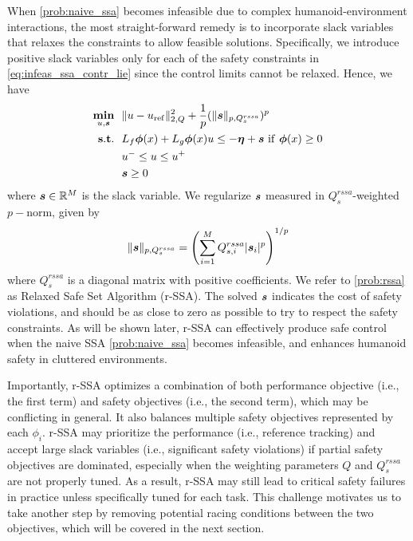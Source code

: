 When \eqref{prob:naive_ssa} becomes infeasible due to complex humanoid-environment interactions, the most straight-forward remedy is to incorporate slack variables that relaxes the constraints to allow feasible solutions.
Specifically, we introduce positive slack variables only for each of the safety constraints in \eqref{eq:infeas_ssa_contr_lie} since the control limits cannot be relaxed.
Hence, we have
\begin{subequations}\label{prob:rssa}
\begin{align}
\mathop{\underset{{u, \bm{s}}}{\mathop{\mathbf{min}}}}~~ & \|u-u_\mathrm{ref}\|_{2,Q}^2+ \frac{1}{p}(\|\bm{s}\|_{p,Q^{rssa}_s})^p  \\
\mathop{\mathbf{s.t.}}~~ & L_f\bm{\phi}(x) + L_g\bm{\phi}(x) u \leq -\bm{\eta} + \bm{s} ~\mathrm{if}~\bm{\phi}(x) \geq 0 \label{eq:safe_contr_rssa}\\ 
& u^- \leq u \leq u^+ \\
&  \bm{s} \geq 0 
\end{align}
\end{subequations}
where $\bm{s}\in\mathbb{R}^{M}$ is the slack variable.
We regularize $\bm{s}$ measured in $Q^{rssa}_s$-weighted $p-$norm, given by
\begin{equation}
\|\bm{s}\|_{p,Q^{rssa}_s} = \left(\sum_{i=1}^{M}Q^{rssa}_{s,i}|\bm{s}_i|^p\right)^{1/p}
\end{equation}
where $Q^{rssa}_s$ is a diagonal matrix with positive coefficients.
We refer to \eqref{prob:rssa} as Relaxed Safe Set Algorithm (r-SSA).
The solved $\bm{s}$ indicates the cost of safety violations, and should be as close to zero as possible to try to respect the safety constraints.
As will be shown later, r-SSA can effectively produce safe control when the naive SSA \eqref{prob:naive_ssa} becomes infeasible, and enhances humanoid safety in cluttered environments.

Importantly, r-SSA optimizes a combination of both performance objective (i.e., the first term) and safety objectives (i.e., the second term), which may be conflicting in general.
It also balances multiple safety objectives represented by each $\phi_i$.
r-SSA may prioritize the performance (i.e., reference tracking) and accept large slack variables (i.e., significant safety violations) if partial safety objectives are dominated, especially when the weighting parameters $Q$ and $Q^{rssa}_s$ are not properly tuned.
As a result, r-SSA may still lead to critical safety failures in practice unless specifically tuned for each task.
This challenge motivates us to take another step by removing potential racing conditions between the two objectives, which will be covered in the next section.

